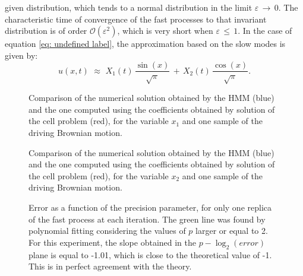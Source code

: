 given distribution, which tends to a normal distribution in the limit
${\varepsilon}\,\to\, 0$. The characteristic time of convergence of the fast
processes to that invariant distribution is of order $\mathcal
O({\varepsilon}^2)$, which is very short when ${\varepsilon}\,\leq\,1$. In the
case of equation \eqref{eq: undefined label}, the approximation based on the
slow modes is given by:
\begin{equation*}
    u(x,t) \,\,{\approx}\,\, X_1(t) \,\frac{\sin(x)}{\sqrt{\pi}} \,+\, X_2(t) \,\frac{\cos(x)}{\sqrt{\pi}}.
\end{equation*}
\begin{figure}[h!]
    \begin{center}
        
    \end{center}
    \caption{Comparison of the numerical solution obtained by the HMM (blue) and the one computed using the coefficients obtained by solution of the cell problem (red), for the variable $x_1$ and one sample of the driving Brownian motion.}
    \label{fig: spde different ps x1}
\end{figure}
\begin{figure}[h!]
    \begin{center}
        
    \end{center}
    \caption{Comparison of the numerical solution obtained by the HMM (blue) and the one computed using the coefficients obtained by solution of the cell problem (red), for the variable $x_2$ and one sample of the driving Brownian motion.}
    \label{fig: spde different ps x2}
\end{figure}

\begin{figure}[h!]
    \begin{center}
        
    \end{center}
    \caption{Error as a function of the precision parameter, for only one replica of the fast process at each iteration. The green line was found by polynomial fitting considering the values of $p$ larger or equal to 2. For this experiment, the slope obtained in the $p-\log_2(error)$ plane is equal to -1.01, which is close to the theoretical value of -1. This is in perfect agreement with the theory.}
    \label{fig: spde error}
\end{figure}
%
